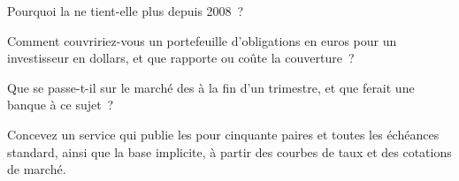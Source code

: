 \begin{interviewq}\label{iq:m2:fx-swaps-forwards-and-the-cross-currency-basis:3}
Pourquoi la  ne tient-elle plus depuis 2008~?
\end{interviewq}

\begin{interviewq}\label{iq:m2:fx-swaps-forwards-and-the-cross-currency-basis:4}
Comment couvririez-vous un portefeuille d'obligations en euros pour un investisseur en dollars, et que
rapporte ou coûte la couverture~?
\end{interviewq}

\begin{interviewq}\label{iq:m2:fx-swaps-forwards-and-the-cross-currency-basis:5}
Que se passe-t-il sur le marché des  à la fin d'un trimestre, et que ferait une banque
à ce sujet~?
\end{interviewq}

\begin{interviewq}\label{iq:m2:fx-swaps-forwards-and-the-cross-currency-basis:6}
Concevez un service qui publie les  pour cinquante paires et toutes les
échéances standard, ainsi que la base implicite, à partir des courbes de taux et des cotations de marché.
\end{interviewq}
